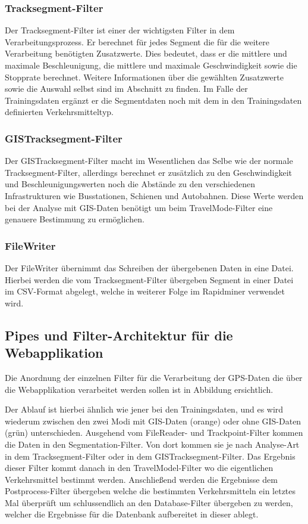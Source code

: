 \subsubsection{Tracksegment-Filter}
\label{tracksegmentFilter}
Der Tracksegment-Filter ist einer der wichtigsten Filter in dem Verarbeitungsprozess. Er berechnet für jedes Segment die für die weitere Verarbeitung benötigten Zusatzwerte. Dies bedeutet, dass er die mittlere und maximale Beschleunigung, die mittlere und maximale Geschwindigkeit sowie die Stopprate berechnet. Weitere Informationen über die gewählten Zusatzwerte sowie die Auswahl selbst sind im Abschnitt  zu finden.  Im Falle der Trainingsdaten ergänzt er die Segmentdaten noch mit dem in den Trainingsdaten definierten Verkehrsmitteltyp.

\subsubsection{GISTracksegment-Filter}
\label{gisTracksegmentFilter}
Der GISTracksegment-Filter macht im Wesentlichen das Selbe wie der normale Tracksegment-Filter, allerdings berechnet er zusätzlich zu den Geschwindigkeit und Beschleunigungswerten noch die Abstände zu den verschiedenen Infrastrukturen wie Busstationen, Schienen und Autobahnen. Diese Werte werden bei der Analyse mit GIS-Daten benötigt um beim TravelMode-Filter eine genauere Bestimmung zu ermöglichen.

\subsubsection{FileWriter}
Der FileWriter übernimmt das Schreiben der übergebenen Daten in eine Datei. Hierbei werden die vom Tracksegment-Filter übergeben Segment in einer Datei im CSV-Format abgelegt, welche in weiterer Folge im Rapidminer verwendet wird.

\subsection{Pipes und Filter-Architektur für die Webapplikation}
Die Anordnung der einzelnen Filter für die Verarbeitung der GPS-Daten die über die Webapplikation verarbeitet werden sollen ist in Abbildung  ersichtlich. 

Der Ablauf ist hierbei ähnlich wie jener bei den Trainingsdaten, und es wird wiederum zwischen den zwei Modi mit GIS-Daten (orange) oder ohne GIS-Daten (grün) unterschieden. Ausgehend vom FileReader- und Trackpoint-Filter kommen die Daten in den Segmentation-Filter. Von dort kommen sie je nach Analyse-Art in dem Tracksegment-Filter oder in dem GISTracksegment-Filter. Das Ergebnis dieser Filter kommt danach in den TravelModel-Filter wo die eigentlichen Verkehrsmittel bestimmt werden. Anschließend werden die Ergebnisse dem Postprocess-Filter übergeben welche die bestimmten Verkehrsmitteln ein letztes Mal überprüft um schlussendlich an den Database-Filter übergeben zu werden, welcher die Ergebnisse für die Datenbank aufbereitet in dieser ablegt.

